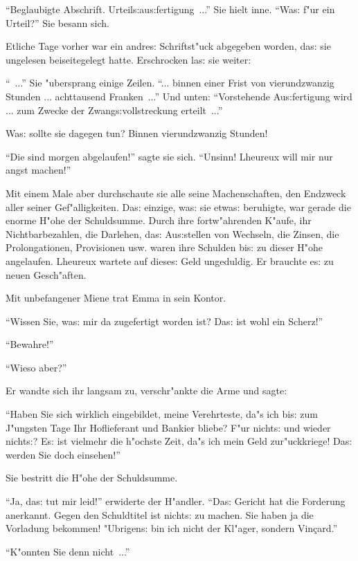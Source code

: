\documentclass[oneside,12pt]{book}
\newcommand{\s}{s:}%
\begin{document}
"`Beglaubigte Abschrift. Urteil{\s}au{\s}fertigung~..."' Sie hielt
inne. "`Wa{\s} f"ur ein Urteil?"' Sie besann sich.

Etliche Tage vorher war ein andre{\s} Schriftst"uck abgegeben
worden, da{\s} sie ungelesen beiseitegelegt hatte. Erschrocken
la{\s} sie weiter:

"`\so{Im Namen de{\s} K"onig{\s}!}~..."' Sie "ubersprang einige
Zeilen. "`... binnen einer Frist von vierundzwanzig Stunden ...
achttausend Franken~..."' Und unten: "`Vorstehende Au{\s}fertigung
wird ... zum Zwecke der Zwang{\s}vollstreckung erteilt~..."'

Wa{\s} sollte sie dagegen tun? Binnen vierundzwanzig Stunden!

"`Die sind morgen abgelaufen!"' sagte sie sich. "`Unsinn! Lheureux
will mir nur angst machen!"'

Mit einem Male aber durchschaute sie alle seine Machenschaften,
den Endzweck aller seiner Gef"alligkeiten. Da{\s} einzige, wa{\s}
sie etwa{\s} beruhigte, war gerade die enorme H"ohe der
Schuldsumme. Durch ihre fortw"ahrenden K"aufe, ihr Nichtbarbezahlen,
die Darlehen, da{\s} Au{\s}stellen von Wechseln, die Zinsen, die
Prolongationen, Provisionen usw. waren ihre Schulden bi{\s} zu
dieser H"ohe angelaufen. Lheureux wartete auf diese{\s} Geld
ungeduldig. Er brauchte e{\s} zu neuen Gesch"aften.

Mit unbefangener Miene trat Emma in sein Kontor.

"`Wissen Sie, wa{\s} mir da zugefertigt worden ist? Da{\s} ist
wohl ein Scherz!"'

"`Bewahre!"'

"`Wieso aber?"'

Er wandte sich ihr langsam zu, verschr"ankte die Arme und sagte:

"`Haben Sie sich wirklich eingebildet, meine Verehrteste, da"s ich
bi{\s} zum J"ungsten Tage Ihr Hoflieferant und Bankier bliebe?
F"ur nicht{\s} und wieder nicht{\s}? E{\s} ist vielmehr die
h"ochste Zeit, da"s ich mein Geld zur"uckkriege! Da{\s} werden Sie
doch einsehen!"'

Sie bestritt die H"ohe der Schuldsumme.

"`Ja, da{\s} tut mir leid!"' erwiderte der H"andler. "`Da{\s}
Gericht hat die Forderung anerkannt. Gegen den Schuldtitel ist
nicht{\s} zu machen. Sie haben ja die Vorladung bekommen!
"Ubrigen{\s} bin ich nicht der Kl"ager, sondern Vin\c{c}ard."'

"`K"onnten Sie denn nicht~..."'
\end{document}
